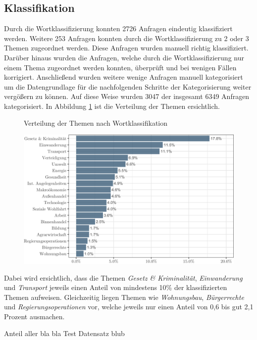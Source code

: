 \documentclass[]{article}
\title{}
\author{}
\date{}
\begin{document}
\subsection{Klassifikation}\label{klassifikation}

Durch die Wortklassifizierung konnten 2726 Anfragen eindeutig
klassifiziert werden. Weitere 253 Anfragen konnten durch die
Wortklassifizierung zu 2 oder 3 Themen zugeordnet werden. Diese Anfragen
wurden manuell richtig klassifiziert. Darüber hinaus wurden die
Anfragen, welche durch die Wortklassifizierung nur einem Thema
zugeordnet werden konnten, überprüft und bei wenigen Fällen korrigiert.
Anschließend wurden weitere wenige Anfragen manuell kategorisiert um die
Datengrundlage für die nachfolgenden Schritte der Kategorisierung weiter
vergößern zu können. Auf diese Weise wurden 3047 der insgesamt 6349
Anfragen kategorisiert. In Abbildung \ref{word_classification} ist die
Verteilung der Themen ersichtlich.

\begin{figure}[!h]
    \caption{Verteilung der Themen nach Wortklassifikation}
    \label{word_classification}
    \centering
    \includegraphics[width=\textwidth]{images/themen_gesamt_manual_matching_test.png}
    \caption*{\scriptsize }
\end{figure}

Dabei wird ersichtlich, dass die Themen \emph{Gesetz \& Kriminalität},
\emph{Einwanderung} und \emph{Transport} jeweils einen Anteil von
mindestens 10\% der klassifizierten Themen aufweisen. Gleichzeitig
liegen Themen wie \emph{Wohnungsbau}, \emph{Bürgerrechte} und
\emph{Regierungsoperationen} vor, welche jeweils nur einen Anteil von
0,6 bis gut 2,1 Prozent ausmachen.

Anteil aller bla bla Test Datensatz blub
\end{document}
